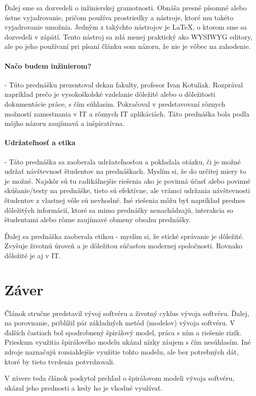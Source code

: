 \documentclass[10pt,twoside,slovak,a4paper]{article}
\begin{document}
Ďalej sme sa dozvedeli o inžinierskej gramotnosti. Obnáša presné písomné alebo ústne vyjadrovanie, pričom používa prostriedky a nástroje, ktoré mu takéto vyjadrovanie umožnia. Jedným z takýchto nástrojov je LaTeX, o ktorom sme sa dozvedeli v zápätí. Tento nástroj sa zdá menej praktický ako WYSIWYG editory, ale po jeho používaní pri písaní článku som názoru, že nie je vôbec na zahodenie.

 \paragraph{Načo budem inžinierom?} - Túto prednášku prezentoval dekan fakulty, profesor Ivan Kotuliak. Rozprával napríklad prečo je vysokoškolské vzdelanie dôležité alebo o dôležitosti dokumentácie práce, s čím súhlasím. Pokračoval v predstavovaní rôznych možností zamestnania v IT a rôznych IT aplikáciách. Táto prednáška bola podľa môjho názoru zaujímavá a inšpiratívna.

\paragraph{Udržateľnosť a etika} - Táto prednáška sa zaoberala udržateľnosťou a pokladala otázku, či je možné udržať návštevnosť študentov na prednáškach. Myslím si, že do určitej miery to je možné. Najskôr sú tu radikálnejšie riešenia ako je povinná účasť alebo povinné skúšanie/testy na prednáške, tieto sú efektívne, ale vrámci udržania návštevnosti študentov z vlastnej vôle sú nevhodné. Iné riešenia môžu byť napríklad prednes dôležitých informácií, ktoré sa mimo prednášky nenachádzajú, interakcia so študentami alebo rôzne zaujímavé obmeny obsahu prednášky.

Ďalej sa prednáška zaoberala etikou - myslím si, že etické správanie je dôležité. Zvyšuje životnú úroveň a je dôležitou súčasťou modernej spoločnosti. Rovnako dôležité je aj v IT.

\section{Záver} \label{zaver} 
Článok stručne predstavil vývoj softvéru a životný cyklus vývoja softvéru. Ďalej, na porovnanie, priblížil pár základných metód (modelov) vývoja softvéru. V ďalších častiach bol spodrobnený špirálový model, práca s ním a riešenie rizík. Prieskum využitia špirálového modelu ukázal nízky záujem s čím nesúhlasím. Iné zdroje naznačujú rozsiahlejšie využitie tohto modelu, ale bez potrebných dát, ktoré by tieto tvrdenia potvrdzovali. 

V závere teda článok poskytol prehľad o špirálovom modeli vývoja softvéru, ukázal jeho prednosti a kedy ho je vhodné využívať.





\end{document}
